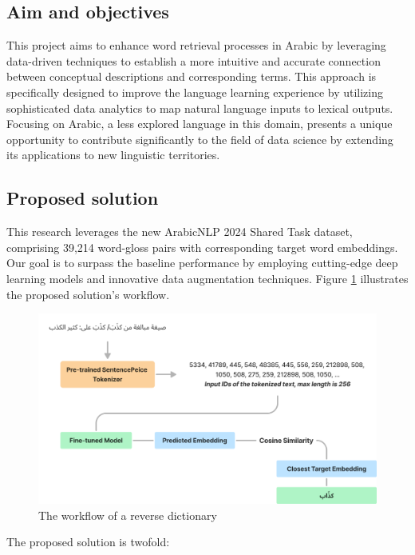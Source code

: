 \documentclass[15pt]{article}
\begin{document}
\subsection{Aim and objectives}

This project aims to enhance word retrieval processes in Arabic by leveraging data-driven techniques to establish a more intuitive and accurate connection between conceptual descriptions and corresponding terms. This approach is specifically designed to improve the language learning experience by utilizing sophisticated data analytics to map natural language inputs to lexical outputs. Focusing on Arabic, a less explored language in this domain, presents a unique opportunity to contribute significantly to the field of data science by extending its applications to new linguistic territories.

\subsection{Proposed solution}

This research leverages the new ArabicNLP 2024 Shared Task dataset, comprising 39,214 word-gloss pairs with corresponding target word embeddings. Our goal is to surpass the baseline performance by employing cutting-edge deep learning models and innovative data augmentation techniques. Figure \ref{fig:rd-flow} illustrates the proposed solution's workflow.

\begin{figure}
    \centering
    \captionsetup{justification=centering}
    \includegraphics[width=\textwidth]{rd-flow.png}
    \caption{The workflow of a reverse dictionary}
    \label{fig:rd-flow}
\end{figure}

The proposed solution is twofold:
\end{document}
